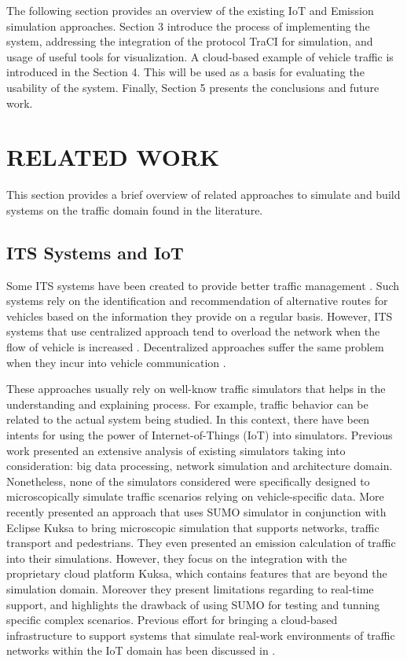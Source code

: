 \documentclass[letter, 10pt, conference]{ieeeconf}
\begin{document}
The following section provides an overview of the existing IoT and Emission simulation approaches.
Section 3 introduce the process of implementing the system, addressing the integration of the protocol TraCI for simulation, and usage of useful tools for visualization.
A cloud-based example of vehicle traffic is introduced in the Section 4. This will be used as a basis for evaluating the usability of the system.
Finally, Section 5 presents the conclusions and future work.

\section{RELATED WORK}

This section provides a brief overview of related approaches to simulate and build systems on the traffic domain found in the literature.

\subsection{ITS Systems and IoT}

Some ITS systems have been created to provide better traffic management \cite{de_souza_real-time_2016} \cite{brennand_intelligent_2015}.
Such systems rely on the identification and recommendation of alternative routes for vehicles based on the information they provide on a regular basis.
However, ITS systems that use centralized approach tend to overload the network when the flow of vehicle is increased \cite{de_souza_fully-distributed_2016}.
Decentralized approaches suffer the same problem when they incur into vehicle communication \cite{de_souza_fully-distributed_2017}.

These approaches usually rely on well-know traffic simulators that helps in the understanding and explaining process.
For example, traffic behavior can be related to the actual system being studied.
In this context, there have been intents for using the power of Internet-of-Things (IoT) into simulators.
Previous work \cite{waddell_architecture_2018} presented an extensive analysis of existing simulators taking into consideration: big data processing, network simulation and architecture domain.
Nonetheless, none of the simulators considered were specifically designed to microscopically simulate traffic scenarios relying on vehicle-specific data.
More recently \cite{hofer_large_2018} presented an approach that uses SUMO simulator in conjunction with Eclipse Kuksa to bring microscopic simulation that supports networks, traffic transport and pedestrians.
They even presented an emission calculation of traffic into their simulations.
However, they focus on the integration with the proprietary cloud platform Kuksa, which contains features that are beyond the simulation domain.
Moreover they present limitations regarding to real-time support, and highlights the drawback of using SUMO for testing and tunning specific complex scenarios.
Previous effort for bringing a cloud-based infrastructure to support systems that simulate real-work environments of traffic networks within the IoT domain has been discussed in \cite{tarneberg_experiences_2016}.
\end{document}
